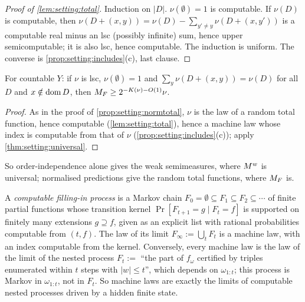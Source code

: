 \begin{proof}[Proof of \cref{lem:setting:total}]
Induction on $|D|$. $\nu(\emptyset)=1$ is computable. If $\nu(D)$ is computable, then $\nu(D+(x,y))=\nu(D)-\sum_{y'\ne y}\nu(D+(x,y'))$ is a computable real minus an lsc (possibly infinite) sum, hence upper semicomputable; it is also lsc, hence computable. The induction is uniform. The converse is \cref{prop:setting:includes}(c), last clause.
\end{proof}

\begin{corollary}\label{cor:setting:normuniversal}
For countable $Y$: if $\nu$ is lsc, $\nu(\emptyset)=1$ and $\sum_y\nu(D+(x,y))=\nu(D)$ for all $D$ and $x\notin\operatorname{dom} D$, then $M_{F}\ge2^{-K(\nu)-O(1)}\nu$.
\end{corollary}

\begin{proof}
As in the proof of \cref{prop:setting:normtotal}, $\nu$ is the law of a random total function, hence computable (\cref{lem:setting:total}), hence a machine law whose index is computable from that of $\nu$ (\cref{prop:setting:includes}(c)); apply \cref{thm:setting:universal}.
\end{proof}

So order-independence alone gives the weak semimeasures, where $M^{w}$ is universal; normalised predictions give the random total functions, where $M_{F}$ is.

\begin{remark}\label{rem:setting:fillin}
A \emph{computable filling-in process} is a Markov chain $F_0=\emptyset\subseteq F_1\subseteq F_2\subseteq\cdots$ of finite partial functions whose transition kernel $\Pr[F_{t+1}=g\mid F_t=f]$ is supported on finitely many extensions $g\supseteq f$, given as an explicit list with rational probabilities computable from $(t,f)$. The law of its limit $F_\infty:=\bigcup_tF_t$ is a machine law, with an index computable from the kernel. Conversely, every machine law is the law of the limit of the nested process $F_t:=$ ``the part of $f_\omega$ certified by triples enumerated within $t$ steps with $|w|\le t$'', which depends on $\omega_{1:t}$; this process is Markov in $\omega_{1:t}$, not in $F_t$. So machine laws are exactly the limits of computable nested processes driven by a hidden finite state.
\end{remark}

